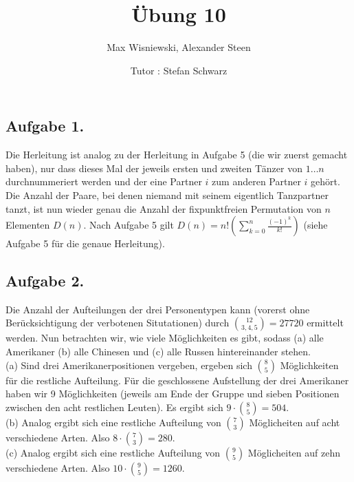 \documentclass[11pt,a4paper,ngerman]{article}
\date{Tutor : Stefan Schwarz}
\title{Übung 10}
\author{Max Wisniewski, Alexander Steen}
\begin{document}

\renewcommand{\figurename}{Figure}

\maketitle
\thispagestyle{fancy}

\subsection*{Aufgabe 1.}
Die Herleitung ist analog zu der Herleitung in Aufgabe 5 (die wir zuerst gemacht haben), nur dass dieses Mal der jeweils ersten und zweiten Tänzer von $1 \ldots n$ durchnummeriert werden und der eine Partner $i$ zum anderen Partner $i$ gehört. Die Anzahl der Paare, bei denen niemand mit seinem eigentlich Tanzpartner tanzt, ist nun wieder genau die Anzahl der fixpunktfreien Permutation von $n$ Elementen $D(n)$. Nach Aufgabe 5 gilt
$D(n) = n! \left(\sum_{k=0}^n \frac{ (-1)^{k} }{k!} \right)$ (siehe Aufgabe 5 für die genaue Herleitung).
\subsection*{Aufgabe 2.}

Die Anzahl der Aufteilungen der drei Personentypen kann (vorerst ohne Berücksichtigung der verbotenen Situtationen) durch $\binom{12}{3,4,5} = 27 720$ ermittelt werden.
Nun betrachten wir, wie viele Möglichkeiten es gibt, sodass (a) alle Amerikaner (b) alle Chinesen und (c) alle
Russen hintereinander stehen.\\
(a) Sind drei Amerikanerpositionen vergeben, ergeben sich $\binom{8}{5}$ Möglichkeiten für die restliche Aufteilung. Für die geschlossene Aufstellung der drei Amerikaner haben wir 9 Möglichkeiten (jeweils am Ende der Gruppe und sieben Positionen zwischen den acht restlichen Leuten).
Es ergibt sich $ 9 \cdot \binom{8}{5} = 504$. \\
(b) Analog ergibt sich eine restliche Aufteilung von $\binom{7}{3}$ Möglicheiten auf acht verschiedene Arten. Also $8 \cdot \binom{7}{3} = 280$. \\
(c) Analog ergibt sich eine restliche Aufteilung von $\binom{9}{5}$ Möglicheiten auf zehn verschiedene Arten. Also $10 \cdot \binom{9}{5} = 1260$. \\
\end{document}

